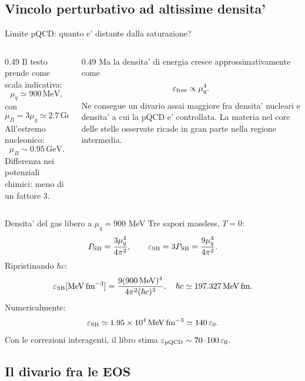 \subsection{Vincolo perturbativo ad altissime densita'}

\begin{frame}{Limite pQCD: quanto e' distante dalla saturazione?}
\small
\begin{columns}[T,onlytextwidth]
\begin{column}{0.49\textwidth}
Il testo prende come scala indicativa:
\[
\mu_q\simeq900\,\mathrm{MeV},
\]
con
\[
\mu_B=3\mu_q\simeq2.7\,\mathrm{GeV}.
\]
All'estremo nucleonico:
\[
\mu_B\sim0.95\,\mathrm{GeV}.
\]
Differenza nei potenziali chimici: meno di un fattore $3$.
\end{column}
\begin{column}{0.49\textwidth}
Ma la densita' di energia cresce approssimativamente come
\[
\varepsilon_{\rm free}\propto\mu_q^4.
\]
Ne consegue un divario assai maggiore fra densita' nucleari e densita' a cui la pQCD e' controllata.
\medskip
La materia nel core delle stelle osservate ricade in gran parte nella regione intermedia.
\end{column}
\end{columns}
\end{frame}

\begin{frame}{Densita' del gas libero a $\mu_q=900$ MeV}
\small
Tre sapori massless, $T=0$:
\[
P_{\rm SB}=\frac{3\mu_q^4}{4\pi^2},
\qquad \varepsilon_{\rm SB}=3P_{\rm SB}=\frac{9\mu_q^4}{4\pi^2}.
\]
Ripristinando $\hbar c$:
\[
\varepsilon_{\rm SB}[\mathrm{MeV\,fm^{-3}}]
=\frac{9(900\,\mathrm{MeV})^4}{4\pi^2(\hbar c)^3},
\quad \hbar c\simeq197.327\,\mathrm{MeV\,fm}.
\]
Numericalmente:
\[
\varepsilon_{\rm SB}\simeq1.95\times10^4\,\mathrm{MeV\,fm^{-3}}
\simeq140\,\varepsilon_0.
\]
Con le correzioni interagenti, il libro stima $\varepsilon_{\rm pQCD}\sim70\text{--}100\,\varepsilon_0$.
\end{frame}

\subsection{Il divario fra le EOS}

